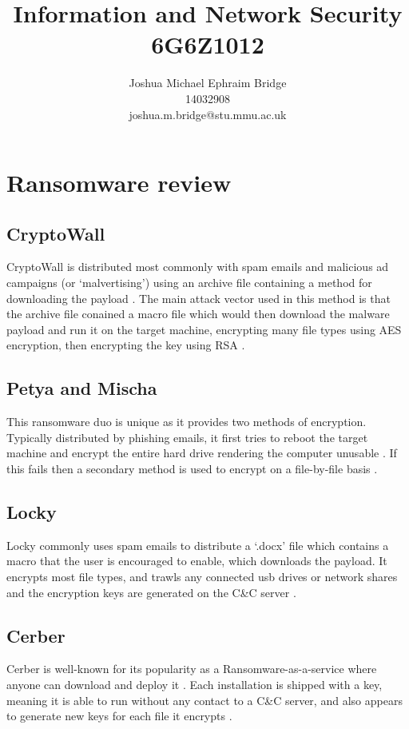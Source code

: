 \documentclass[12pt]{article}
\title{\vspace{2cm}\textbf{Information and Network Security}\\6G6Z1012}
\author{Joshua Michael Ephraim Bridge\\14032908\\joshua.m.bridge@stu.mmu.ac.uk}
\begin{document}
\maketitle

\tableofcontents

\newpage

\section{Ransomware review}
  \subsection{CryptoWall}
    CryptoWall is distributed most commonly with spam emails and malicious ad campaigns (or ‘malvertising’) using an archive file containing a method for downloading the payload \citep{symantec2016cryptowall}. The main attack vector used in this method is that the archive file conained a macro file which would then download the malware payload and run it on the target machine, encrypting many file types using AES encryption, then encrypting the key using RSA \citep{sophos2015cryptowall}.

  \subsection{Petya and Mischa}
    This ransomware duo is unique as it provides two methods of encryption. Typically distributed by phishing emails, it first tries to reboot the target machine and encrypt the entire hard drive rendering the computer unusable \citep{malwarebytes2016petya}. If this fails then a secondary method is used to encrypt on a file-by-file basis \citep{avast2016petya}.

  \subsection{Locky}
    Locky commonly uses spam emails to distribute a ‘.docx’ file which contains a macro that the user is encouraged to enable, which downloads the payload. It encrypts most file types, and trawls any connected usb drives or network shares \citep{ducklin2016locky} and the encryption keys are generated on the C\&C server \citep{avast2017locky}.

  \subsection{Cerber}
    Cerber is well-known for its popularity as a Ransomware-as-a-service where anyone can download and deploy it \citep{barkly2017cerber}. Each installation is shipped with a key, meaning it is able to run without any contact to a C\&C server, and also appears to generate new keys for each file it encrypts \citep{malwarebytes2016cerber}.
\end{document}
